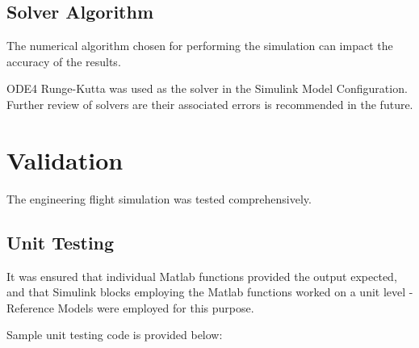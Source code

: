 \documentclass[]{article}
\begin{document}
\clearpage

\subsection{Solver Algorithm}\label{solver-algorithm}

The numerical algorithm chosen for performing the simulation can impact
the accuracy of the results.

ODE4 Runge-Kutta was used as the solver in the Simulink Model
Configuration. Further review of solvers are their associated errors is
recommended in the future.

\section{Validation}\label{validation}

The engineering flight simulation was tested comprehensively.

\subsection{Unit Testing}\label{unit-testing}

It was ensured that individual Matlab functions provided the output
expected, and that Simulink blocks employing the Matlab functions worked
on a unit level - Reference Models were employed for this purpose.

Sample unit testing code is provided below:
\end{document}
